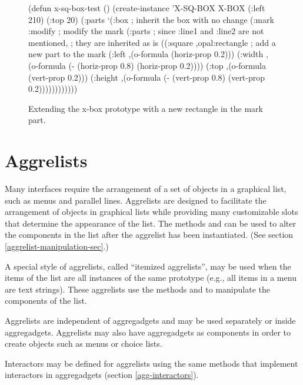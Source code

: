 \begin{figure}
\begin{center}
\end{center}
\begin{programexample}

(defun x-sq-box-test ()
  (create-instance 'X-SQ-BOX X-BOX
    (:left 210)
    (:top 20)
    (:parts
     `(:box		; inherit the box with no change
       (:mark :modify	; modify the mark
	(:parts		; since :line1 and :line2 are not mentioned,
			; they are inherited as is
	 ((:square ,opal:rectangle	; add a new part to the mark
	      (:left ,(o-formula (horiz-prop 0.2)))
	      (:width ,(o-formula (- (horiz-prop 0.8)
				     (horiz-prop 0.2))))
	      (:top ,(o-formula (vert-prop 0.2)))
	      (:height ,(o-formula (- (vert-prop 0.8)
				      (vert-prop 0.2))))))))))))
\end{programexample}
\caption{Extending the x-box prototype with a new rectangle in the mark
part.}
\end{figure}

\section{Aggrelists}
\label{aggrelists}

Many interfaces require the arrangement of a set of objects in a graphical
list, such as menus and parallel lines.  Aggrelists are designed to
facilitate the arrangement of objects in graphical lists while providing
many customizable slots that determine the appearance of the list.  The
methods  and  can be used to alter
the components in the list after the aggrelist has been instantiated.
(See section \ref{aggrelist-manipulation-sec}.)

A special style of aggrelists, called ``itemized aggrelists'', may be used
when the items of the list are all instances of the same prototype (e.g., all
items in a menu are text strings).
These aggrelists use the methods  and 
to manipulate the components of the list.

Aggrelists are independent of aggregadgets and may be used separately or
inside aggregadgets.  Aggrelists may also have aggregadgets as components
in order to create objects such as menus or choice lists.

Interactors may be defined for aggrelists using the same methods that
implement interactors in aggregadgets (section \ref{agg-interactors}).

